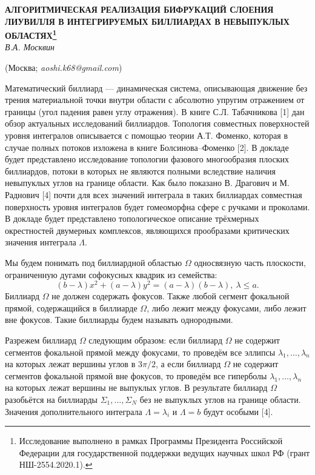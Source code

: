 \begin{center}
    {\bf АЛГОРИТМИЧЕСКАЯ РЕАЛИЗАЦИЯ БИФРУКАЦИЙ СЛОЕНИЯ ЛИУВИЛЛЯ В ИНТЕГРИРУЕМЫХ
    БИЛЛИАРДАХ В НЕВЫПУКЛЫХ ОБЛАСТЯХ\footnote{Исследование выполнено в рамках Программы Президента Российской Федерации для государственной поддержки ведущих научных школ РФ (грант НШ-2554.2020.1).}}\\

    {\it В.А. Москвин}

    (Москва; {\it aoshi.k68@gmail.com})
\end{center}

Математический биллиард --- динамическая система, опи\-сы\-вающая движение без трения материальной точки внутри области с абсолютно упругим отражением от границы (угол падения равен углу отражения). В книге С.Л. Табач\-никова [1] дан обзор актуальных исследований биллиардов. Тополо\-гия совместных поверхностей уровня интег\-ралов опи\-сывается с помощью теории А.Т. Фоменко, которая в случае полных потоков изло\-жена в книге Болсинова--Фоменко [2]. В докладе будет пред\-став\-лено ис\-следование топологии фазового много\-образия плос\-ких бил\-лиардов, потоки в которых не являются полными вследствие наличия не\-выпук\-лых углов на границе области. Как было показано В. Драгович и М. Раднович [4] почти для всех значений интеграла в таких биллиардах совместная поверхность уровня интегралов будет гомеоморфна сфере с ручками и проколами. В докладе будет пред\-ставлено топ\-олог\-ичес\-кое описание трёхмерных ок\-рест\-ностей дву\-мерных ком\-плек\-сов, являющихся прообразами критичес\-ких значения интеграла $\Lambda$.


Мы будем понимать под биллиардной областью $\Omega$ однос\-вязную часть плоскости, ограниченную дугами софокусных квадрик из семейства:
$$(b-\lambda)x^2+(a-\lambda)y^2=(a-\lambda)(b-\lambda),~\lambda \leq a. $$
Биллиард $\Omega$ не должен содержать фокусов. Также любой сегмент фокальной прямой, содержащийся в биллиарде $\Omega$, либо лежит между фокусами, либо лежит вне фокусов. Такие биллиарды будем называть однородными.

Разрежем биллиард $\Omega$ следующим образом: если биллиард $\Omega$ не содержит сегментов фокальной прямой между фокусами, то проведём все эллипсы $\lambda_1, \ldots, \lambda_n$ на которых лежат вершины углов в $3\pi/2$, а если биллиард $\Omega$ не содержит сегментов фокальной прямой вне фокусов, то проведём все гиперболы $\lambda_1, \ldots, \lambda_n$ на которых лежат вершины не выпуклых углов. В результате биллиард $\Omega$ разобьётся на биллиарды $\Sigma_1, \ldots, \Sigma_N$ без не выпуклых углов на границе области. Значения допол\-нитель\-ного интеграла $\Lambda = \lambda_i$ и $\Lambda = b$ будут особыми [4].

